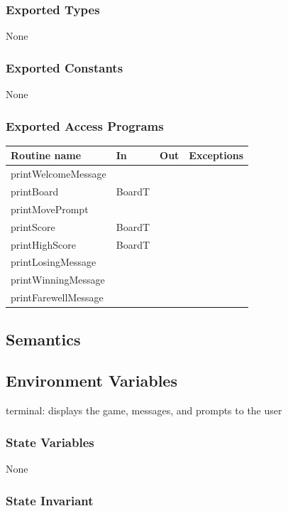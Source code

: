 \documentclass[12pt]{article}
\begin{document}
\subsubsection* {Exported Types}

None

\subsubsection* {Exported Constants}

None

\subsubsection* {Exported Access Programs}

\begin{tabular}{| l | l | l | p{6cm} |}
\hline
\textbf{Routine name} & \textbf{In} & \textbf{Out} & \textbf{Exceptions}\\
\hline
printWelcomeMessage & ~ & ~ &  \\
\hline
printBoard & BoardT & ~ & \\
\hline
printMovePrompt & ~ & ~ & \\
\hline
printScore & BoardT & ~ & \\
\hline
printHighScore & BoardT & ~ & \\
\hline
printLosingMessage & ~ & ~ & \\
\hline
printWinningMessage & ~ & ~ & \\
\hline
printFarewellMessage & ~ & ~ & \\
\hline
\end{tabular}

\subsection* {Semantics}

\subsection*{Environment Variables}

terminal: displays the game, messages, and prompts to the user

\subsubsection* {State Variables}

None

\subsubsection* {State Invariant}
\end{document}
